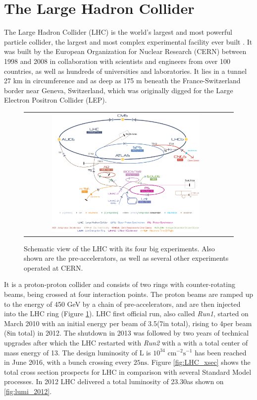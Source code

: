 

\section{The Large Hadron Collider}

The Large Hadron Collider (LHC) is the world's largest and most powerful particle collider, the largest and most complex experimental facility ever built \cite{ipac11:lamont}. It was built by the European Organization for Nuclear Research (CERN) between 1998 and 2008 in collaboration with scientists and engineers from over 100 countries, as well as hundreds of universities and laboratories. It lies in a tunnel 27 km in circumference and as deep as 175 m beneath the France-Switzerland border near Geneva, Switzerland, which was originally digged for the Large Electron Positron Collider (LEP). 

\begin{figure}[tbh!]
	\centering
	\begin{tabular}{cc}
		\includegraphics[width=0.75\textwidth]{detector/pics/CERN_complex.jpg}
	\end{tabular}
	\caption{Schematic view of the LHC with its four big experiments. Also shown are the pre-accelerators, as well as several other experiments operated at CERN.}
	\label{fig:CERN_complex}
\end{figure}

It is a proton-proton collider and consists of two rings with counter-rotating beams, being crossed at four interaction points. The proton beams are ramped up to the energy of 450 GeV by a chain of pre-accelerators, and are then injected into the LHC ring (Figure \ref{fig:CERN_complex}). LHC first official run, also called \textit{Run1}, started on March 2010 with an initial energy per beam of 3.5\tev (7\tev in total), rising to 4\tev per beam (8\tev in total) in 2012. The shutdown in 2013 was followed by two years of technical upgrades after which the LHC restarted with \textit{Run2} with a with a total center of mass energy of 13\tev. The design luminosity of L is $10^{34}$ \ensuremath{\text{cm}^{-2}\text{s}^{-1}} has been reached in June 2016, with a bunch crossing every $25 \text{ns}$. Figure \ref{fig:LHC_xsec} shows the total cross section prospects for LHC in comparison with several Standard Model processes. In 2012 LHC delivered a total luminosity of 23.30\invfb as shown on \ref{fig:lumi_2012}.

